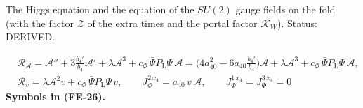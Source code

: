 \documentclass[
  10pt,
]{article}
\begin{document}
The Higgs equation and the equation of the \(SU(2)\) gauge fields on the
fold (with the factor \(\mathcal{Z}\) of the extra times and the portal
factor \(\mathcal{K}_W\)). Status: DERIVED.

\[
\begin{aligned}
&\mathcal{R}_{\mathcal{A}} = \mathcal{A}'' + 3\frac{b_4'}{b_4}\mathcal{A}' + \lambda\mathcal{A}^3 + c_\Phi\,\bar\Psi P_{\mathrm{L}}\Psi\,\mathcal{A}
 = \Big(4a_{40}^2 - 6a_{40}\frac{b_4'}{b_4}\Big)\mathcal{A} + \lambda\mathcal{A}^3 + c_\Phi\,\bar\Psi P_{\mathrm{L}}\Psi\,\mathcal{A},\\
&\mathcal{R}_v = \lambda\mathcal{A}^2v + c_\Phi\,\bar\Psi P_{\mathrm{L}}\Psi\,v,\qquad
 J_\Phi^{2\,x_4} = a_{40}\,v\,\mathcal{A},\qquad J_\Phi^{1\,x_4} = J_\Phi^{3\,x_4} = 0
\end{aligned} \tag{FE-26}
\] \textbf{Symbols in (FE-26).}
\end{document}
